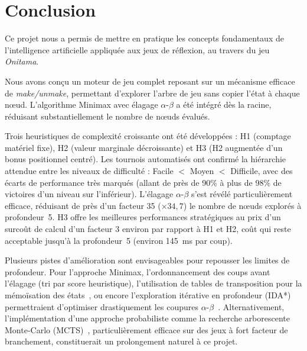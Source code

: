 \documentclass[12pt, a4paper]{article}
\begin{document}
\newpage
\section{Conclusion}
\label{sec:conclusion}

Ce projet nous a permis de mettre en pratique les concepts fondamentaux de l'intelligence
artificielle appliquée aux jeux de réflexion, au travers du jeu \textit{Onitama}.

Nous avons conçu un moteur de jeu complet reposant sur un mécanisme efficace de \textit{make/unmake},
permettant d'explorer l'arbre de jeu sans copier l'état à chaque nœud. L'algorithme Minimax
avec élagage $\alpha\text{-}\beta$ a été intégré dès la racine, réduisant substantiellement le nombre
de nœuds évalués.

Trois heuristiques de complexité croissante ont été développées : H1 (comptage matériel fixe),
H2 (valeur marginale décroissante) et H3 (H2 augmentée d'un bonus positionnel centré).
Les tournois automatisés ont confirmé la hiérarchie attendue entre les niveaux de difficulté :
Facile $<$ Moyen $<$ Difficile, avec des écarts de performance très marqués (allant de 
près de 90\% à plus de 98\% de victoires d'un niveau sur l'inférieur). L'élagage $\alpha\text{-}\beta$ s'est 
révélé particulièrement efficace, réduisant de près d'un facteur 35 ($\times 34{,}7$) le nombre de nœuds 
explorés à profondeur~5. H3 offre les meilleures performances stratégiques au prix d'un surcoût 
de calcul d'un facteur 3 environ par rapport à H1 et H2, coût qui reste acceptable jusqu'à la 
profondeur~5 (environ 145~ms par coup).

Plusieurs pistes d'amélioration sont envisageables pour repousser les limites de profondeur. 
Pour l'approche Minimax, l'ordonnancement des coups avant l'élagage (tri par score heuristique), 
l'utilisation de tables de transposition pour la mémoïsation des états~\cite{memoisation}, ou encore 
l'exploration itérative en profondeur (IDA*) permettraient d'optimiser drastiquement les 
coupures $\alpha\text{-}\beta$~\cite{IDA}. Alternativement, l'implémentation d'une approche 
probabiliste comme la recherche arborescente Monte-Carlo (MCTS)~\cite{mcts}, 
particulièrement efficace sur des jeux à fort facteur de branchement, constituerait un 
prolongement naturel à ce projet.
\end{document}

